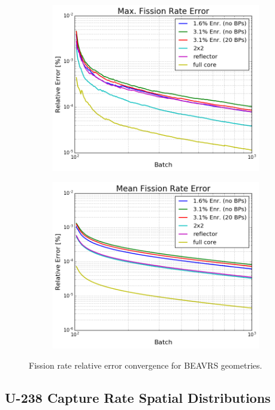 \begin{figure}[h!]
\centering
\begin{subfigure}{\textwidth}
  \centering
  \includegraphics[width=0.8\linewidth]{figures/benchmarks/fission-rates/fiss-conv-max-assms}
  \caption{}
  \label{fig:chap7-fiss-rate-max-conv-max}
\end{subfigure}
\begin{subfigure}{\textwidth}
  \centering
  \includegraphics[width=0.8\linewidth]{figures/benchmarks/fission-rates/fiss-conv-mean-assms}
  \caption{}
  \label{fig:chap7-fiss-rate-max-conv-mean}
\end{subfigure}
\caption[Fission rate error convergence for BEAVRS geometries]{Fission rate relative error convergence for \ac{BEAVRS} geometries.}
\label{fig:chap7-fiss-rates-conv}
\end{figure}

\subsection{U-238 Capture Rate Spatial Distributions}
\label{subsec:chap7-capture-rates}

